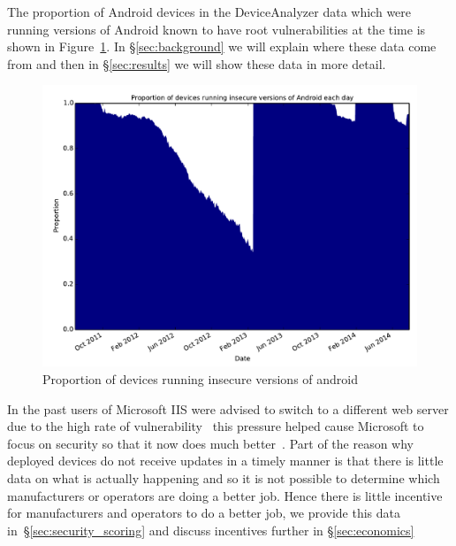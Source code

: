 \documentclass[conference,a4paper,twoside]{IEEEtran}
\begin{document}
The proportion of Android devices in the DeviceAnalyzer data which were running versions of Android known to have root vulnerabilities at the time is shown in Figure~\ref{fig:proportioninsecure}.
In \S\ref{sec:background} we will explain where these data come from and then in \S\ref{sec:results} we will show these data in more detail.

\begin{figure}[!b]
\centering
\includegraphics[width=\columnwidth]{figures/proportioninsecure}
\caption{Proportion of devices running insecure versions of android}
\label{fig:proportioninsecure}
\end{figure}

In the past users of Microsoft IIS were advised to switch to a different web server due to the high rate of vulnerability~\cite{Pescatore2001} this pressure helped cause Microsoft to focus on security so that it now does much better~\cite{TODO}.
Part of the reason why deployed devices do not receive updates in a timely manner is that there is little data on what is actually happening and so it is not possible to determine which manufacturers or operators are doing a better job.
Hence there is little incentive for manufacturers and operators to do a better job, we provide this data  in~\S\ref{sec:security_scoring} and discuss incentives further in \S\ref{sec:economics}
\end{document}
